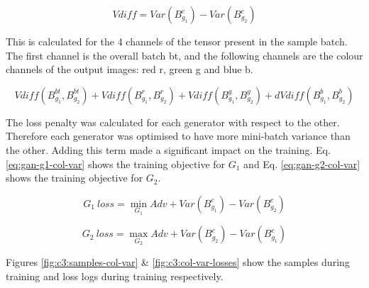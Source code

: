 \begin{equation}
    \label{eq:variance-gan}
    Vdiff = Var(B_{g_{1}}^{c}) - Var(B_{g_{2}}^{c})
    \end{equation}

This is calculated for the 4 channels of the tensor present in the sample batch. 
The first channel is the overall batch bt, and the following channels are the colour channels of the output images: red r, green g and blue b.

\begin{equation}
    \label{eq:total-gan}
        Vdiff(B_{g_{1}}^{bt} , B_{g_{2}}^{bt}) + Vdiff(B_{g_{1}}^{r} , B_{g_{2}}^{r}) + Vdiff(B_{g_{1}}^{g} , B_{g_{2}}^{g}) +  dVdiff(B_{g_{1}}^{b} , B_{g_{2}}^{b}) 
    \end{equation}

The loss penalty was calculated for each generator with respect to the other. 
Therefore each generator was optimised to have more mini-batch variance than the other. 
Adding this term made a significant impact on the training. Eq. \ref{eq:gan-g1-col-var} shows the training objective for $G_{1}$ and Eq.  \ref{eq:gan-g2-col-var} shows the training objective for $G_{2}$.

\begin{equation} 
    G_{1}\ loss = \min_{G_{1}}Adv + Var(B_{g_{1}}^{c}) - Var(B_{g_{2}}^{c})
    \label{eq:gan-g1-col-var}
\end{equation}

\begin{equation} 
    G_{2}\ loss = \max_{G_{2}}Adv + Var(B_{g_{2}}^{c}) - Var(B_{g_{1}}^{c})
    \label{eq:gan-g2-col-var}
\end{equation}

Figures \ref{fig:c3:samples-col-var} \& \ref{fig:c3:col-var-losses} show the samples during training and loss logs during training respectively.

